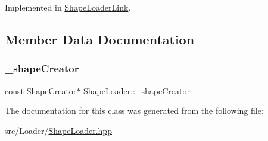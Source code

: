 Implemented in \hyperlink{class_shape_loader_link_a0637abbe648488e98f4130bd9827bd72}{Shape\+Loader\+Link}.



\subsection{Member Data Documentation}
\hypertarget{class_shape_loader_ae412cdea4d16545ea9845870ec1e83e5}{}\label{class_shape_loader_ae412cdea4d16545ea9845870ec1e83e5} 
\subsubsection{\texorpdfstring{\+\_\+shape\+Creator}{\_shapeCreator}}
{\footnotesize\ttfamily const \hyperlink{class_shape_creator}{Shape\+Creator}$\ast$ Shape\+Loader\+::\+\_\+shape\+Creator\hspace{0.3cm}{\ttfamily [protected]}}



The documentation for this class was generated from the following file\+:\begin{DoxyCompactItemize}
\item 
src/\+Loader/\hyperlink{_shape_loader_8hpp}{Shape\+Loader.\+hpp}\end{DoxyCompactItemize}
